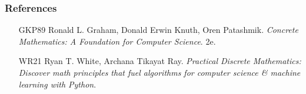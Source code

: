 \documentclass{beamer}
\begin{document}
\begin{frame}
	\frametitle{References}
	\begin{itemize}
		\item[GKP89] {\sc Ronald L. Graham, Donald Erwin Knuth, Oren Patashmik}. {\it Concrete Mathematics: A Foundation for Computer Science}. 2e.
		
		\item[WR21] {\sc Ryan T. White, Archana Tikayat Ray}. {\it Practical Discrete Mathematics: Discover math principles that fuel algorithms for computer science \& machine learning with Python}.		
	\end{itemize}
	
\end{frame}
\end{document}
